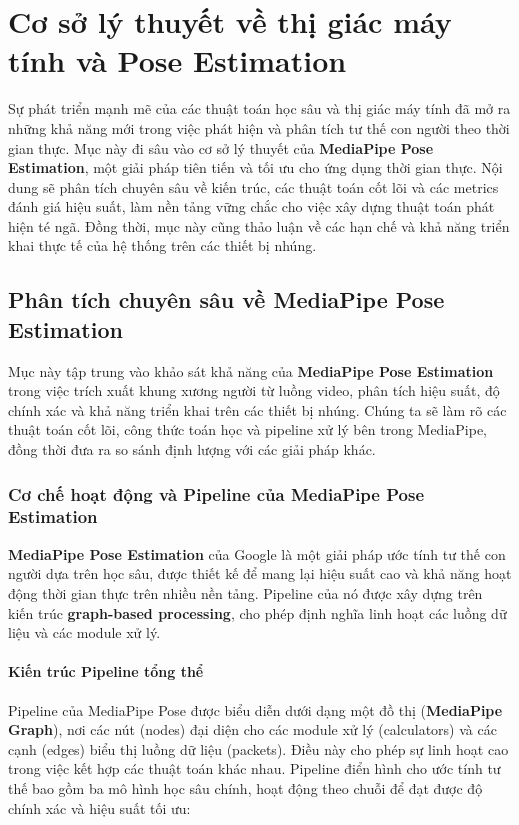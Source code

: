 \section{Cơ sở lý thuyết về thị giác máy tính và Pose Estimation}

Sự phát triển mạnh mẽ của các thuật toán học sâu và thị giác máy tính đã mở ra những khả năng mới trong việc phát hiện và phân tích tư thế con người theo thời gian thực. Mục này đi sâu vào cơ sở lý thuyết của \textbf{MediaPipe Pose Estimation}, một giải pháp tiên tiến và tối ưu cho ứng dụng thời gian thực. Nội dung sẽ phân tích chuyên sâu về kiến trúc, các thuật toán cốt lõi và các metrics đánh giá hiệu suất, làm nền tảng vững chắc cho việc xây dựng thuật toán phát hiện té ngã. Đồng thời, mục này cũng thảo luận về các hạn chế và khả năng triển khai thực tế của hệ thống trên các thiết bị nhúng.

\subsection{Phân tích chuyên sâu về MediaPipe Pose Estimation}

Mục này tập trung vào khảo sát khả năng của \textbf{MediaPipe Pose Estimation} trong việc trích xuất khung xương người từ luồng video, phân tích hiệu suất, độ chính xác và khả năng triển khai trên các thiết bị nhúng. Chúng ta sẽ làm rõ các thuật toán cốt lõi, công thức toán học và pipeline xử lý bên trong MediaPipe, đồng thời đưa ra so sánh định lượng với các giải pháp khác.

\subsubsection{Cơ chế hoạt động và Pipeline của MediaPipe Pose Estimation}

\textbf{MediaPipe Pose Estimation} của Google là một giải pháp ước tính tư thế con người dựa trên học sâu, được thiết kế để mang lại hiệu suất cao và khả năng hoạt động thời gian thực trên nhiều nền tảng. Pipeline của nó được xây dựng trên kiến trúc \textbf{graph-based processing}, cho phép định nghĩa linh hoạt các luồng dữ liệu và các module xử lý. 

\paragraph{Kiến trúc Pipeline tổng thể}

Pipeline của MediaPipe Pose được biểu diễn dưới dạng một đồ thị (\textbf{MediaPipe Graph}), nơi các nút (nodes) đại diện cho các module xử lý (calculators) và các cạnh (edges) biểu thị luồng dữ liệu (packets). Điều này cho phép sự linh hoạt cao trong việc kết hợp các thuật toán khác nhau. Pipeline điển hình cho ước tính tư thế bao gồm ba mô hình học sâu chính, hoạt động theo chuỗi để đạt được độ chính xác và hiệu suất tối ưu:

